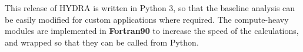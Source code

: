 \noindent This release of HYDRA is written in Python 3, so that the baseline analysis can be easily modified for custom applications where required. The compute-heavy modules are implemented in \textbf{Fortran90} to increase the speed of the calculations, and wrapped so that they can be called from Python. %